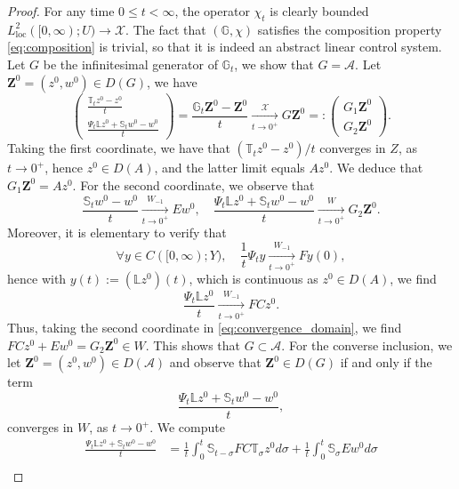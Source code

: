 \documentclass[10pt]{article}
\newcommand{\oploc}{\operatorname{loc}}
\begin{document}
\begin{proof}
For any time $0 \leq t < \infty$, the operator $\chi_t$ is clearly bounded $L^2_{\oploc}([0,\infty) ; U) \to \mathcal{X}$. The fact that $(\mathbb{G},\chi)$ satisfies the composition property \eqref{eq:composition} is trivial, so that it is indeed an abstract linear control system. 
\newline
\newline
Let $G$ be the infinitesimal generator of $\mathbb{G}_t$, we show that $G = \mathcal{A}$. Let $\mathbf{Z}^0 = (z^0,w^0) \in D(G)$, we have 
\begin{equation}\label{eq:convergence_domain}
    \left( \begin{array}{c}
    \frac{\mathbb{T}_t z^0 - z^0}{t} \\
    \frac{\Psi_t \mathbb{L} z^0 + \mathbb{S}_t w^0 - w^0}{t} 
\end{array}\right) = \frac{\mathbb{G}_t \mathbf{Z}^0 - \mathbf{Z}^0}{t} \xrightarrow[t \to 0^+]{\mathcal{X}} G \mathbf{Z}^0 =: \left( \begin{array}{c}
    G_1\mathbf{Z}^0  \\
    G_2 \mathbf{Z}^0
\end{array}\right). 
\end{equation}
Taking the first coordinate, we have that $(\mathbb{T}_t z^0 - z^0)/t$ converges in $Z$, as $t \to 0^+$, hence $z^0 \in D(A)$, and the latter limit equals $Az^0$. We deduce that $G_1\mathbf{Z}^0 = Az^0$. For the second coordinate, we observe that 
\[
\frac{\mathbb{S}_t w^0 - w^0 }{t} \xrightarrow[t \to 0^+]{W_{-1}} E w^0,\quad \frac{\Psi_t \mathbb{L} z^0 + \mathbb{S}_t w^0 - w^0}{t} \xrightarrow[t \to 0^+]{W} G_2 \mathbf{Z}^0.
\]
Moreover, it is elementary to verify that 
\begin{equation}\label{eq:trivial}
    \forall y \in C([0,\infty) ; Y),\quad \frac{1}{t} \Psi_t y \xrightarrow[t \to 0^+]{W_{-1}} Fy(0),
\end{equation}
hence with $y(t) := (\mathbb{L} z^0)(t)$, which is continuous as $z^0 \in D(A)$, we find
\[
\frac{\Psi_t \mathbb{L} z^0}{t} \xrightarrow[t \to 0^+]{W_{-1}} FCz^0. 
\]
Thus, taking the second coordinate in \eqref{eq:convergence_domain}, we find $FCz^0 + Ew^0 = G_2 \mathbf{Z}^0 \in W$. This shows that $G \subset \mathcal{A}$. For the converse inclusion, we let $\mathbf{Z}^0 = (z^0,w^0) \in D(\mathcal{A})$ and observe that $\mathbf{Z}^0 \in D(G)$ if and only if the term 
\[
\frac{\Psi_t \mathbb{L} z^0 + \mathbb{S}_t w^0 - w^0}{t}, 
\]
converges in $W$, as $t \to 0^+$. We compute 
\begin{align*}
    \frac{\Psi_t \mathbb{L} z^0 + \mathbb{S}_t w^0 - w^0}{t} &= \frac{1}{t} \int_0^t \mathbb{S}_{t-\sigma} FC \mathbb{T}_\sigma z^0 d\sigma + \frac{1}{t} \int_0^t \mathbb{S}_\sigma Ew^0 d\sigma \\

\end{align*}
\end{proof}
\end{document}
